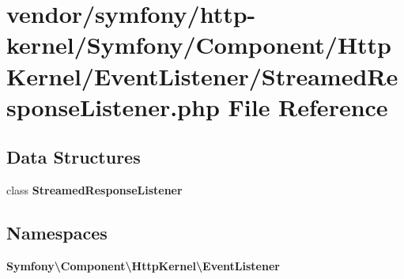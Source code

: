 \section{vendor/symfony/http-\/kernel/\+Symfony/\+Component/\+Http\+Kernel/\+Event\+Listener/\+Streamed\+Response\+Listener.php File Reference}
\label{_streamed_response_listener_8php}
\subsection*{Data Structures}
\begin{DoxyCompactItemize}
\item 
class {\bf Streamed\+Response\+Listener}
\end{DoxyCompactItemize}
\subsection*{Namespaces}
\begin{DoxyCompactItemize}
\item 
 {\bf Symfony\textbackslash{}\+Component\textbackslash{}\+Http\+Kernel\textbackslash{}\+Event\+Listener}
\end{DoxyCompactItemize}
